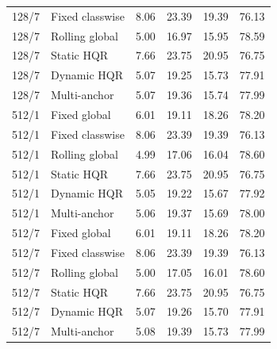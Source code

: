 \begin{longtable}{llrrrr}
128/7 & Fixed classwise & 8.06 & 23.39 & 19.39 & 76.13\\
128/7 & Rolling global & 5.00 & 16.97 & 15.95 & 78.59\\
128/7 & Static HQR & 7.66 & 23.75 & 20.95 & 76.75\\
128/7 & Dynamic HQR & 5.07 & 19.25 & 15.73 & 77.91\\
128/7 & Multi-anchor & 5.07 & 19.36 & 15.74 & 77.99\\
512/1 & Fixed global & 6.01 & 19.11 & 18.26 & 78.20\\
512/1 & Fixed classwise & 8.06 & 23.39 & 19.39 & 76.13\\
512/1 & Rolling global & 4.99 & 17.06 & 16.04 & 78.60\\
512/1 & Static HQR & 7.66 & 23.75 & 20.95 & 76.75\\
512/1 & Dynamic HQR & 5.05 & 19.22 & 15.67 & 77.92\\
512/1 & Multi-anchor & 5.06 & 19.37 & 15.69 & 78.00\\
512/7 & Fixed global & 6.01 & 19.11 & 18.26 & 78.20\\
512/7 & Fixed classwise & 8.06 & 23.39 & 19.39 & 76.13\\
512/7 & Rolling global & 5.00 & 17.05 & 16.01 & 78.60\\
512/7 & Static HQR & 7.66 & 23.75 & 20.95 & 76.75\\
512/7 & Dynamic HQR & 5.07 & 19.26 & 15.70 & 77.91\\
512/7 & Multi-anchor & 5.08 & 19.39 & 15.73 & 77.99\\
\end{longtable}\endgroup
